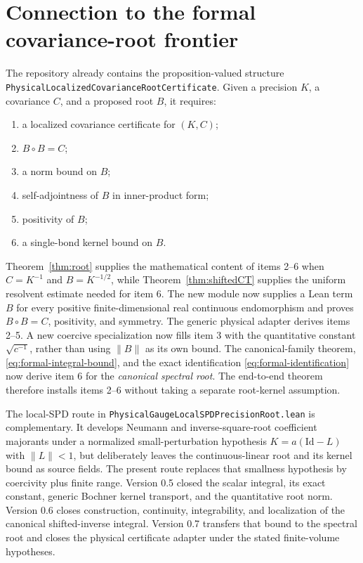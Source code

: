 \documentclass[11pt]{article}
\theoremstyle{definition}
\newcommand{\Id}{\mathrm{Id}}
\newcommand{\norm}[1]{\lVert #1\rVert}
\newcommand{\lean}[1]{\texttt{#1}}
\begin{document}
\section{Connection to the formal covariance-root frontier}\label{sec:frontier}

The repository already contains the proposition-valued structure
\texttt{PhysicalLocalizedCovariance}\allowbreak\texttt{RootCertificate}.
Given a precision $K$, a
covariance $C$, and a proposed root $B$, it requires:
\begin{enumerate}
\item a localized covariance certificate for $(K,C)$;
\item $B\circ B=C$;
\item a norm bound on $B$;
\item self-adjointness of $B$ in inner-product form;
\item positivity of $B$;
\item a single-bond kernel bound on $B$.
\end{enumerate}
Theorem~\ref{thm:root} supplies the mathematical content of items 2--6 when
$C=K^{-1}$ and $B=K^{-1/2}$, while Theorem~\ref{thm:shiftedCT} supplies the
uniform resolvent estimate needed for item 6.  The new module
 now supplies a Lean term $B$ for
every positive finite-dimensional real continuous endomorphism and proves
$B\circ B=C$, positivity, and symmetry.  The generic physical adapter derives
items 2--5.  A new coercive specialization now fills item 3 with the
quantitative constant $\sqrt{c^{-1}}$, rather than using $\norm B$ as its own
bound.  The canonical-family theorem, \eqref{eq:formal-integral-bound}, and the
exact identification \eqref{eq:formal-identification} now derive item 6 for
the \emph{canonical spectral root}.  The end-to-end theorem
 therefore
installs items 2--6 without taking a separate root-kernel assumption.

The local-SPD route in
\lean{PhysicalGaugeLocalSPDPrecisionRoot.lean} is complementary.  It develops
Neumann and inverse-square-root coefficient majorants under a normalized
small-perturbation hypothesis
$K=a(\Id-L)$ with $\norm L<1$, but deliberately leaves the continuous-linear
root and its kernel bound as source fields.  The present route replaces that
smallness hypothesis by coercivity plus finite range.  Version 0.5 closed the
scalar integral, its exact constant, generic Bochner kernel transport, and the
quantitative root norm.  Version 0.6 closes construction, continuity,
integrability, and localization of the canonical shifted-inverse integral.
Version 0.7 transfers that bound to the spectral root and closes the physical
certificate adapter under the stated finite-volume hypotheses.
\end{document}
